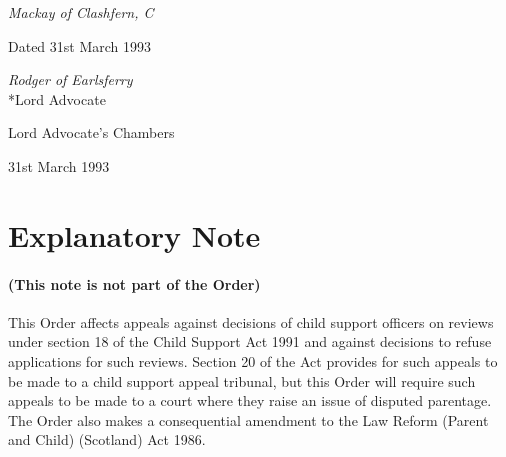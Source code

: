 \documentclass[a4paper]{article}
\newcommand{\parthead}{}
\begin{document}
%
%
%
%

\bigskip

{\raggedleft
\emph{Mackay of Clashfern, C}

}

Dated 31st March 1993

\bigskip

{\raggedleft
\emph{Rodger of Earlsferry}\\*Lord Advocate

}

Lord Advocate's Chambers

31st March 1993

\part{Explanatory Note}

\renewcommand\parthead{--- Explanatory Note}

\subsection*{(This note is not part of the Order)}

This Order affects appeals against decisions of child support officers on reviews under section 18 of the Child Support Act 1991 and against decisions to refuse applications for such reviews. Section 20 of the Act provides for such appeals to be made to a child support appeal tribunal, but this Order will require such appeals to be made to a court where they raise an issue of disputed parentage. The Order also makes a consequential amendment to the Law Reform (Parent and Child) (Scotland) Act 1986.
\end{document}
